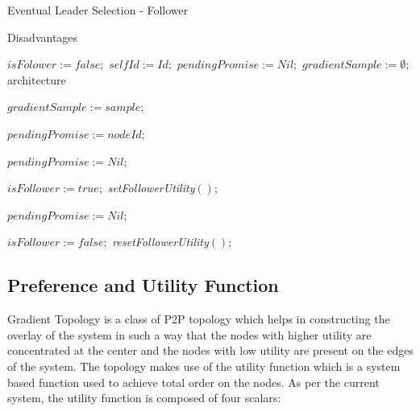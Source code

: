 \documentclass[12pt,a4paper,twoside,openright]{book}
\begin{document}
\begin{algorithm}[h]
\caption{Eventual Leader Selection - Follower} 
\label{follower}Disadvantages
\begin{algorithmic}[1]

  \State $isFolower := false;$
  \State $selfId := Id;$ $pendingPromise := Nil;$
  \State $gradientSample := \emptyset;$architecture
\EndUponS

  \State $gradientSample := sample;$
 \EndUpon

    \State $pendingPromise := nodeId;$
    \EndTrigger
    \TriggerS[promiseTimeout]{}\EndTriggerS
  \Else
     \EndTrigger
  \EndIf
\EndUpon

\UponS[promiseTimeout]{}
  \State $pendingPromise := Nil;$
\EndUponS

    \TriggerS[followerLeaseTimeout]{}\EndTriggerS
    \TriggerS[cancelPromiseTimeout]{}\EndTriggerS
    \State $isFollower := true;$
    \State \emph{setFollowerUtility}$();$
  \EndIf
\EndUpon

\UponS[promiseTimeout]{}
  \State $pendingPromise := Nil;$
\EndUponS

\UponS[leaseTimeout]{} 
  \State $isFollower := false;$
  \State \emph{resetFollowerUtility}$();$
\EndUponS

\end{algorithmic}
\end{algorithm}





\subsection{Preference and Utility Function}
\label{ssec:utility}

Gradient Topology is a class of P2P topology which helps in constructing the overlay of the system in such a way that the nodes with higher utility are concentrated at the center and the nodes with low utility are present on the edges of the system. The topology makes use of the utility function which is a system based function used to achieve total order on the nodes. As per the current system, the utility function is composed of four scalars:
\end{document}
